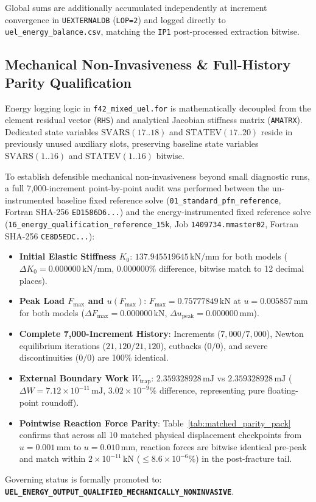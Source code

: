 Global sums are additionally accumulated independently at increment convergence in \texttt{UEXTERNALDB} (\texttt{LOP=2}) and logged directly to \nolinkurl{uel_energy_balance.csv}, matching the \texttt{IP1} post-processed extraction bitwise.

\subsection{Mechanical Non-Invasiveness \& Full-History Parity Qualification}
Energy logging logic in \nolinkurl{f42_mixed_uel.for} is mathematically decoupled from the element residual vector (\texttt{RHS}) and analytical Jacobian stiffness matrix (\texttt{AMATRX}). Dedicated state variables $\mathrm{SVARS}(17..18)$ and $\mathrm{STATEV}(17..20)$ reside in previously unused auxiliary slots, preserving baseline state variables $\mathrm{SVARS}(1..16)$ and $\mathrm{STATEV}(1..16)$ bitwise.

To establish defensible mechanical non-invasiveness beyond small diagnostic runs, a full 7,000-increment point-by-point audit was performed between the un-instrumented baseline fixed reference solve (\nolinkurl{01_standard_pfm_reference}, Fortran SHA-256 \nolinkurl{ED1586D6...}) and the energy-instrumented fixed reference solve (\nolinkurl{16_energy_qualification_reference_15k}, Job \texttt{1409734.mmaster02}, Fortran SHA-256 \nolinkurl{CE8D5EDC...}):
\begin{itemize}
  \item \textbf{Initial Elastic Stiffness $K_0$}: $137.945519645\,\mathrm{kN/mm}$ for both models ($\Delta K_0 = 0.000000\,\mathrm{kN/mm}$, $0.000000\%$ difference, bitwise match to 12 decimal places).
  \item \textbf{Peak Load $F_{\max}$ and $u(F_{\max})$}: $F_{\max} = 0.75777849\,\mathrm{kN}$ at $u = 0.005857\,\mathrm{mm}$ for both models ($\Delta F_{\max} = 0.000000\,\mathrm{kN}$, $\Delta u_{\mathrm{peak}} = 0.000000\,\mathrm{mm}$).
  \item \textbf{Complete 7,000-Increment History}: Increments ($7{,}000/7{,}000$), Newton equilibrium iterations ($21{,}120/21{,}120$), cutbacks ($0/0$), and severe discontinuities ($0/0$) are 100\% identical.
  \item \textbf{External Boundary Work $W_{\mathrm{trap}}$}: $2.359328928\,\mathrm{mJ}$ vs $2.359328928\,\mathrm{mJ}$ ($\Delta W = 7.12\times 10^{-11}\,\mathrm{mJ}$, $3.02\times 10^{-9}\%$ difference, representing pure floating-point roundoff).
  \item \textbf{Pointwise Reaction Force Parity}: Table~\ref{tab:matched_parity_pack} confirms that across all 10 matched physical displacement checkpoints from $u = 0.001\,\mathrm{mm}$ to $u = 0.010\,\mathrm{mm}$, reaction forces are bitwise identical pre-peak and match within $2\times 10^{-11}\,\mathrm{kN}$ ($\le 8.6\times 10^{-6}\%$) in the post-fracture tail.
\end{itemize}
Governing status is formally promoted to: \textbf{\texttt{UEL\_ENERGY\_OUTPUT\_QUALIFIED\_MECHANICALLY\_NONINVASIVE}}.

